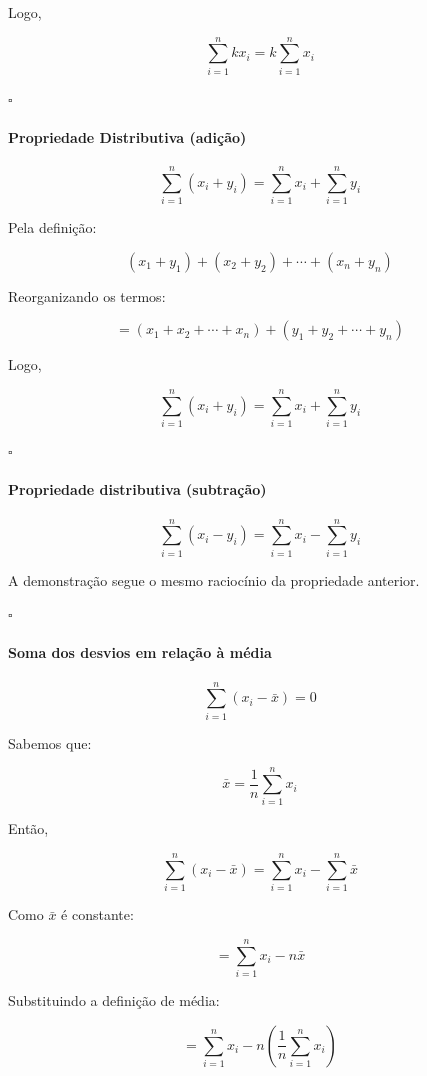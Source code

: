 Logo,

\[
\sum_{i=1}^{n} kx_i = k \sum_{i=1}^{n} x_i
\]

\hfill $\square$

\paragraph{Propriedade Distributiva (adição)} 

\[
\sum_{i=1}^{n} (x_i + y_i)
=
\sum_{i=1}^{n} x_i +
\sum_{i=1}^{n} y_i
\]

Pela definição:

\[
(x_1+y_1) + (x_2+y_2) + \cdots + (x_n+y_n)
\]

Reorganizando os termos:

\[
= (x_1 + x_2 + \cdots + x_n)
+
(y_1 + y_2 + \cdots + y_n)
\]

Logo,

\[
\sum_{i=1}^{n} (x_i + y_i)
=
\sum_{i=1}^{n} x_i +
\sum_{i=1}^{n} y_i
\]

\hfill $\square$

\paragraph{Propriedade distributiva (subtração)}


\[
\sum_{i=1}^{n} (x_i - y_i)
=
\sum_{i=1}^{n} x_i -
\sum_{i=1}^{n} y_i
\]

A demonstração segue o mesmo raciocínio da propriedade anterior.

\hfill $\square$

\paragraph{Soma dos desvios em relação à média}

\[
\sum_{i=1}^{n} (x_i - \bar{x}) = 0
\]

Sabemos que:

\[
\bar{x} = \frac{1}{n} \sum_{i=1}^{n} x_i
\]

Então,

\[
\sum_{i=1}^{n} (x_i - \bar{x})
=
\sum_{i=1}^{n} x_i
-
\sum_{i=1}^{n} \bar{x}
\]

Como $\bar{x}$ é constante:

\[
=
\sum_{i=1}^{n} x_i
-
n\bar{x}
\]

Substituindo a definição de média:

\[
=
\sum_{i=1}^{n} x_i
-
n \left( \frac{1}{n} \sum_{i=1}^{n} x_i \right)
\]

